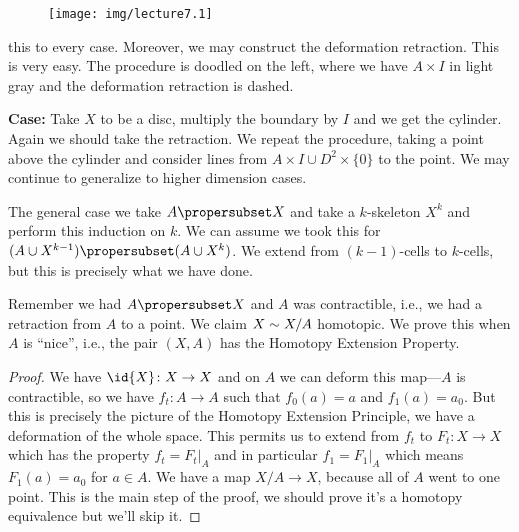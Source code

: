 \begin{wrapfigure}{l}{0.75in}
  \vspace{-18pt}
  \texttt{[image: img/lecture7.1]}
  \vspace{-36pt}
\end{wrapfigure}
\noindent this to every
case. Moreover, we may construct the deformation retraction.
This is very easy. The procedure is doodled on the left, where we
have $A\times I$ in light gray and the deformation retraction is
dashed. 

\medbreak
\noindent\textbf{Case:} Take $X$ to be a disc, multiply the
boundary by $I$ and we get the cylinder.
Again we should take the retraction. We repeat the procedure,
taking a point above the cylinder and consider lines from
$A\times I\cup D^{2}\times\{0\}$ to the point. We may continue to
generalize to higher dimension cases.

The general case we take $A\propersubset X$ and take a
$k$-skeleton $X^{k}$ and perform this induction on $k$. We can
assume we took this for $(A\cup X^{k-1})\propersubset(A\cup X^{k})$.
We extend from $(k-1)$-cells to $k$-cells, but this is precisely
what we have done.\hfill\qedsymbol\break

Remember we had $A\propersubset X$ and $A$ was contractible,
i.e., we had a retraction from $A$ to a point. We claim
$X\sim X/A$ homotopic. We prove this when $A$ is ``nice'',
i.e., the pair $(X,A)$ has the Homotopy Extension Property.
\begin{proof}
We have $\id{X}\colon X\to X$ and on $A$ we can deform this
map---$A$ is contractible, so we have $f_{t}\colon A\to A$ such
that $f_{0}(a)=a$ and $f_{1}(a)=a_{0}$. But this is precisely the
picture of the Homotopy Extension Principle, we have a
deformation of the whole space. This permits us to extend from
$f_{t}$ to $F_{t}\colon X\to X$ which has the property
$f_{t}=\left.F_{t}\right|_{A}$ and in particular $f_{1}=\left.F_{1}\right|_{A}$
which means $F_{1}(a)=a_{0}$ for $a\in A$. We have a map $X/A\to X$,
because all of $A$ went to one point. This is the main step of
the proof, we should prove it's a homotopy equivalence but we'll
skip it.
\end{proof}

